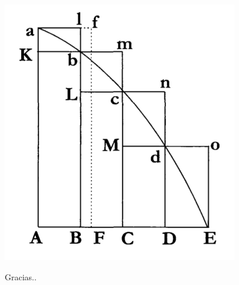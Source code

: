 \documentclass[presentation]{beamer}
\begin{document}
\begin{frame}[label=sec-16]{}
\includegraphics[width=.9\linewidth]{./puntos_extremos.png}
\end{frame}


\begin{frame}[label=sec-17]{Gracias..}
\end{frame}
\end{document}
